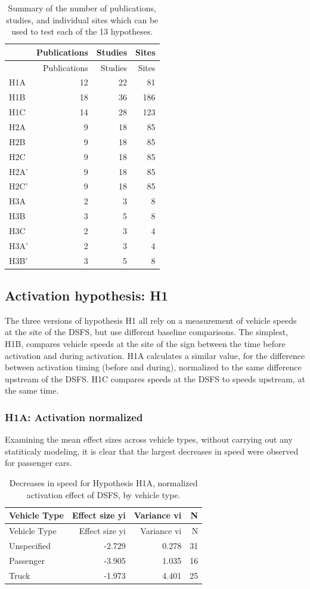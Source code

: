 \documentclass[]{article}
\begin{document}
\begin{longtable}[]{@{}lrrr@{}}
\caption{\label{tab:tab1}Summary of the number of publications, studies,
and individual sites which can be used to test each of the 13
hypotheses.}\tabularnewline
\toprule
& Publications & Studies & Sites\tabularnewline
\midrule
\endfirsthead
\toprule
& Publications & Studies & Sites\tabularnewline
\midrule
\endhead
H1A & 12 & 22 & 81\tabularnewline
H1B & 18 & 36 & 186\tabularnewline
H1C & 14 & 28 & 123\tabularnewline
H2A & 9 & 18 & 85\tabularnewline
H2B & 9 & 18 & 85\tabularnewline
H2C & 9 & 18 & 85\tabularnewline
H2A' & 9 & 18 & 85\tabularnewline
H2C' & 9 & 18 & 85\tabularnewline
H3A & 2 & 3 & 8\tabularnewline
H3B & 3 & 5 & 8\tabularnewline
H3C & 2 & 3 & 4\tabularnewline
H3A' & 2 & 3 & 4\tabularnewline
H3B' & 3 & 5 & 8\tabularnewline
\bottomrule
\end{longtable}

\subsection{Activation hypothesis: H1}\label{activation-hypothesis-h1}

The three versions of hypothesis H1 all rely on a measurement of vehicle
speeds at the site of the DSFS, but use different baseline comparisons.
The simplest, H1B, compares vehicle speeds at the site of the sign
between the time before activation and during activation. H1A calculates
a similar value, for the difference between activation timing (before
and during), normalized to the same difference upstream of the DSFS. H1C
compares speeds at the DSFS to speeds upstream, at the same time.

\subsubsection{H1A: Activation
normalized}\label{h1a-activation-normalized}

Examining the mean effect sizes across vehicle types, without carrying
out any statiticaly modeling, it is clear that the largest decreases in
speed were observed for passenger cars.

\begin{longtable}[]{@{}lrrr@{}}
\caption{Decreases in speed for Hypothesis H1A, normalized activation
effect of DSFS, by vehicle type.}\tabularnewline
\toprule
Vehicle Type & Effect size yi & Variance vi & N\tabularnewline
\midrule
\endfirsthead
\toprule
Vehicle Type & Effect size yi & Variance vi & N\tabularnewline
\midrule
\endhead
Unspecified & -2.729 & 0.278 & 31\tabularnewline
Passenger & -3.905 & 1.035 & 16\tabularnewline
Truck & -1.973 & 4.401 & 25\tabularnewline
\bottomrule
\end{longtable}
\end{document}
